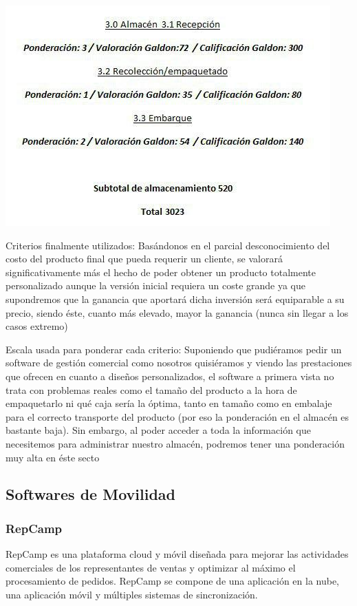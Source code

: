 \documentclass{article}
\begin{document}
\begin{flushleft}
	\includegraphics[scale=0.8]{imagenes/Galdon3.jpg}
\end{flushleft}

Criterios finalmente utilizados: Basándonos en el parcial desconocimiento del costo del producto final que pueda requerir un cliente, se valorará significativamente más el hecho de poder obtener un producto totalmente personalizado aunque la versión inicial requiera un coste grande ya que supondremos que la ganancia que aportará dicha inversión será equiparable a su precio, siendo éste, cuanto más elevado, mayor la ganancia (nunca sin llegar a los casos extremo) 

Escala usada para ponderar cada criterio: Suponiendo que pudiéramos pedir un software de gestión comercial como nosotros quisiéramos y viendo las prestaciones que ofrecen en cuanto a diseños personalizados, el software a primera vista no trata con problemas reales como el tamaño del producto a la hora de empaquetarlo ni qué caja sería la óptima, tanto en tamaño como en embalaje para el correcto transporte del producto (por eso la ponderación en el almacén es bastante baja). Sin embargo, al poder acceder a toda la información que necesitemos para administrar nuestro almacén, podremos tener una ponderación muy alta en éste secto

\subsection{Softwares de Movilidad}

\subsubsection{RepCamp}

	RepCamp es una plataforma cloud y móvil diseñada para mejorar las actividades comerciales de los representantes de ventas y optimizar al máximo el procesamiento de pedidos.  RepCamp se compone de una aplicación en la nube, una aplicación móvil y múltiples sistemas de sincronización. 
\end{document}
